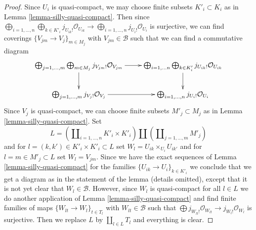 \documentclass[10pt,a4paper]{amsart}
\theoremstyle{plain}
\theoremstyle{definition}
\theoremstyle{remark}
\numberwithin{equation}{subsection}
\begin{document}
\begin{proof}
Since $U_i$ is quasi-compact, we may choose finite subsets $K'_i \subset K_i$
as in Lemma \ref{lemma-silly-quasi-compact}.
Then since
$\bigoplus_{i = 1, \ldots, n}
\bigoplus_{k \in K'_i} j_{U_{ik}!}\mathcal{O}_{U_{ik}} \to
\bigoplus_{i = 1, \ldots, n} j_{U_i!}\mathcal{O}_{U_i}$ is surjective,
we can find coverings $\{V_{jm} \to V_j\}_{m \in M_j}$ with
$V_{jm} \in \mathcal{B}$ such that we can find a commutative diagram
$$
\xymatrix{
\bigoplus_{j = 1, \ldots, m} \bigoplus_{m \in M_j}
j_{V_{jm}!}\mathcal{O}_{V_{jm}} \ar[d] \ar[r] &
\bigoplus_{i = 1, \ldots n} \bigoplus_{k \in K'_i}
j_{U_{ik}!}\mathcal{O}_{U_{ik}} \ar[d] \\
\bigoplus_{j = 1, \ldots, m} j_{V_j!}\mathcal{O}_{V_j} \ar[r] &
\bigoplus_{i = 1, \ldots, n} j_{U_i!}\mathcal{O}_{U_i}
}
$$
Since $V_j$ is quasi-compact, we can choose finite subsets
$M'_j \subset M_j$ as in Lemma \ref{lemma-silly-quasi-compact}.
Set
$$
L = \left(\coprod\nolimits_{i = 1, \ldots, n} K'_i \times K'_i \right)
\coprod
\left(\coprod\nolimits_{j = 1, \ldots, m} M'_j\right)
$$
and for $l = (k, k') \in K'_i \times K'_i \subset L$ set
$W_l = U_{ik} \times_{U_i} U_{ik'}$ and for
$l = m \in M'_j \subset L$ set $W_l = V_{jm}$.
Since we have the exact sequences of Lemma \ref{lemma-silly-quasi-compact}
for the families $\{U_{ik} \to U_i\}_{k \in K'_i}$
we conclude that we get a diagram as in the statement of the lemma
(details omitted), except that it is not yet clear that $W_l \in \mathcal{B}$.
However, since $W_l$ is quasi-compact for all $l \in L$
we do another application of Lemma \ref{lemma-silly-quasi-compact}
and find finite families of maps $\{W_{lt} \to W_l\}_{t \in T_l}$
with $W_{lt} \in \mathcal{B}$ such that
$\bigoplus j_{W_{lt}!}\mathcal{O}_{W_{lt}} \to j_{W_l!}\mathcal{O}_{W_l}$
is surjective. Then we replace $L$ by $\coprod_{l \in L} T_l$
and everything is clear.
\end{proof}
\end{document}
